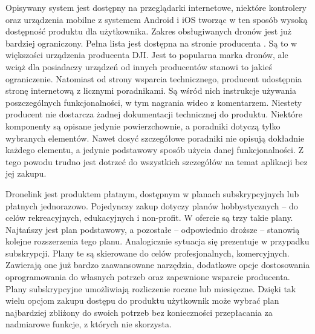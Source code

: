 Opisywany system jest dostępny na przeglądarki internetowe, niektóre kontrolery oraz urządzenia mobilne z systemem Android i iOS tworząc w ten sposób wysoką dostępność produktu dla użytkownika. Zakres obsługiwanych dronów jest już bardziej ograniczony. Pełna lista jest dostępna na stronie producenta \cite{dronelink_supported}. Są to w większości urządzenia producenta DJI. Jest to popularna marka dronów, ale wciąż dla posiadaczy urządzeń od innych producentów stanowi to jakieś ograniczenie. Natomiast od strony wsparcia technicznego, producent udostępnia stronę internetową z licznymi poradnikami. Są wśród nich instrukcje używania poszczególnych funkcjonalności, w tym nagrania wideo z komentarzem. Niestety producent nie dostarcza żadnej dokumentacji technicznej do produktu. Niektóre komponenty są opisane jedynie powierzchownie, a poradniki dotyczą tylko wybranych elementów. Nawet dosyć szczegółowe poradniki nie opisują dokładnie każdego elementu, a jedynie podstawowy sposób użycia danej funkcjonalności. Z tego powodu trudno jest dotrzeć do wszystkich szczegółów na temat aplikacji bez jej zakupu.

Dronelink jest produktem płatnym, dostępnym w planach subskrypcyjnych lub płatnych jednorazowo. Pojedynczy zakup dotyczy planów hobbystycznych – do celów rekreacyjnych, edukacyjnych i non-profit. W ofercie są trzy takie plany. Najtańszy jest plan podstawowy, a pozostałe – odpowiednio droższe – stanowią kolejne rozszerzenia tego planu. Analogicznie sytuacja się prezentuje w przypadku subskrypcji. Plany te są skierowane do celów profesjonalnych, komercyjnych. Zawierają one już bardzo zaawansowane narzędzia, dodatkowe opcje dostosowania oprogramowania do własnych potrzeb oraz zapewnione wsparcie producenta. Plany subskrypcyjne umożliwiają rozliczenie roczne lub miesięczne. Dzięki tak wielu opcjom zakupu dostępu do produktu użytkownik może wybrać plan najbardziej zbliżony do swoich potrzeb bez konieczności przepłacania za nadmiarowe funkcje, z których nie skorzysta.